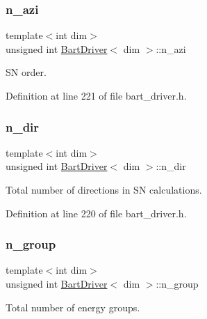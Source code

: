 \subsubsection{\texorpdfstring{n\+\_\+azi}{n\_azi}}
{\footnotesize\ttfamily template$<$int dim$>$ \\
unsigned int \hyperlink{class_bart_driver}{Bart\+Driver}$<$ dim $>$\+::n\+\_\+azi\hspace{0.3cm}{\ttfamily [private]}}



SN order. 



Definition at line 221 of file bart\+\_\+driver.\+h.

\mbox{\label{class_bart_driver_aa1694538581e7941bbda0960bd3c7e39}} 
\subsubsection{\texorpdfstring{n\+\_\+dir}{n\_dir}}
{\footnotesize\ttfamily template$<$int dim$>$ \\
unsigned int \hyperlink{class_bart_driver}{Bart\+Driver}$<$ dim $>$\+::n\+\_\+dir\hspace{0.3cm}{\ttfamily [private]}}



Total number of directions in SN calculations. 



Definition at line 220 of file bart\+\_\+driver.\+h.

\mbox{\label{class_bart_driver_aeb5a04392c80b32379b02e18acbc1126}} 
\subsubsection{\texorpdfstring{n\+\_\+group}{n\_group}}
{\footnotesize\ttfamily template$<$int dim$>$ \\
unsigned int \hyperlink{class_bart_driver}{Bart\+Driver}$<$ dim $>$\+::n\+\_\+group\hspace{0.3cm}{\ttfamily [private]}}



Total number of energy groups. 



